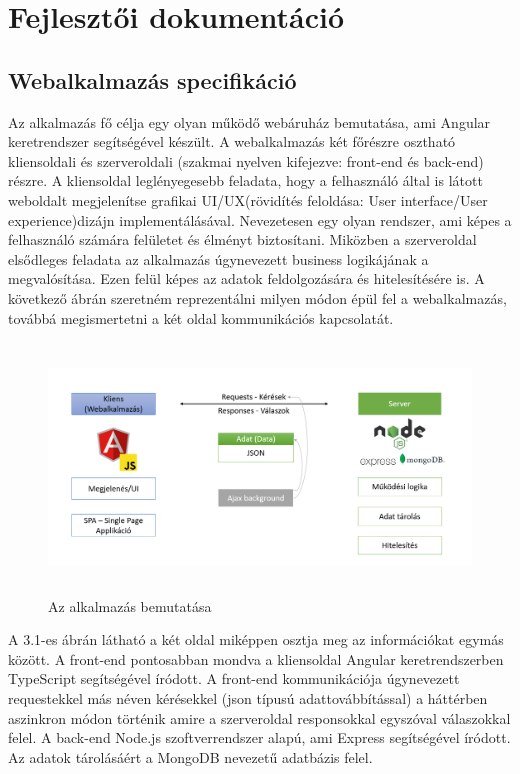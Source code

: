 \chapter{Fejlesztői dokumentáció} %
\label{ch:impl}

\section{Webalkalmazás specifikáció}
Az alkalmazás fő célja egy olyan működő webáruház bemutatása, ami Angular keretrendszer segítségével készült. A webalkalmazás két főrészre osztható kliensoldali és szerveroldali (szakmai nyelven kifejezve: front-end és back-end) részre. A kliensoldal leglényegesebb feladata, hogy a felhasználó által is látott weboldalt megjelenítse grafikai UI/UX(rövidítés feloldása: User interface/User experience)dizájn implementálásával. Nevezetesen egy olyan rendszer, ami képes a felhasználó számára felületet és élményt biztosítani. Miközben a szerveroldal elsődleges feladata az alkalmazás úgynevezett business logikájának a megvalósítása. Ezen felül képes az adatok feldolgozására és hitelesítésére is. A következő ábrán szeretném reprezentálni milyen módon épül fel a webalkalmazás, továbbá megismertetni a két oldal kommunikációs kapcsolatát.

\begin{figure}[H]
	\centering
	\includegraphics[width=1.0\textwidth,height=250px]{images/alkalmazas_bemutatasa.png}
	\caption{Az alkalmazás bemutatása}
	\label{fig.picture-1}
\end{figure}

A 3.1-es ábrán látható a két oldal miképpen osztja meg az információkat egymás között. A front-end pontosabban mondva a kliensoldal Angular keretrendszerben TypeScript segítségével íródott. A front-end kommunikációja úgynevezett requestekkel más néven kérésekkel (json típusú adattovábbítással) a háttérben aszinkron módon történik amire a szerveroldal responsokkal egyszóval válaszokkal felel. A back-end Node.js szoftverrendszer alapú, ami Express segítségével íródott. Az adatok tárolásáért a MongoDB nevezetű adatbázis felel.

